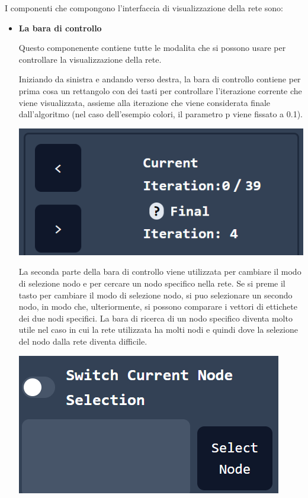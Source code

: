 \documentclass[a4paper,12pt]{report}
\begin{document}
			I componenti che compongono l'interfaccia di visualizzazione della rete sono:
			\begin{itemize}
			\item \textbf{La bara di controllo} \par
			Questo componenente contiene tutte le modalita che si possono usare per controllare la visualizzazione della rete. \par
			Iniziando da sinistra e andando verso destra, la bara di controllo contiene per prima cosa un rettangolo con dei tasti per controllare l'iterazione corrente che viene visualizzata, assieme alla iterazione che viene considerata finale dall'algoritmo (nel caso dell'esempio colori, il parametro p viene fissato a 0.1). \par
			\includegraphics[width=\textwidth, height=\textheight, keepaspectratio]{iterationcontrol}

			La seconda parte della bara di controllo viene utilizzata per cambiare il modo di selezione nodo e per cercare un nodo specifico nella rete. Se si preme il tasto per cambiare il modo di selezione nodo, si puo selezionare un secondo nodo, in modo che, ulteriormente, si possono comparare i vettori di ettichete dei due nodi specifici. La bara di ricerca di un nodo specifico diventa molto utile nel caso in cui la rete utilizzata ha molti nodi e quindi dove la selezione del nodo dalla rete diventa difficile. \par
			\includegraphics[width=\textwidth, height=\textheight, keepaspectratio]{nodeselection}


\end{itemize}
\end{document}
